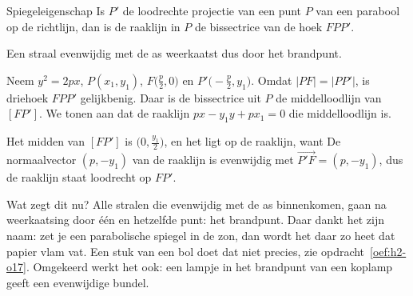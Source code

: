 \begin{theorie}
\begin{minipage}[t]{.6\linewidth}
\vspace{0pt}
\begin{stelling}{Spiegeleigenschap}
Is $P'$ de loodrechte projectie van een punt $P$ van een parabool op de richtlijn, dan is de raaklijn in $P$ de bissectrice van de hoek $FPP'$.

\vspace{1mm}
Een straal evenwijdig met de as weerkaatst dus door het brandpunt.
\end{stelling}

\begin{bewijs}
Neem $y^2 = 2px$, $P(x_1, y_1)$, $F\bigl(\tfrac p2, 0\bigr)$ en $P'\bigl(-\tfrac p2, y_1\bigr)$. Omdat $|PF| = |PP'|$, is driehoek $FPP'$ gelijkbenig. Daar is de bissectrice uit $P$ de middelloodlijn van $[FP']$. We tonen aan dat de raaklijn $px - y_1 y + px_1 = 0$ die middelloodlijn is.

Het midden van $[FP']$ is $\bigl(0, \tfrac{y_1}{2}\bigr)$, en het ligt op de raaklijn, want
De normaalvector $(p, -y_1)$ van de raaklijn is evenwijdig met $\overrightarrow{P'F} = (p, -y_1)$, dus de raaklijn staat loodrecht op $FP'$.
\end{bewijs}
\end{minipage}\hfill
\begin{minipage}[t]{.36\linewidth}
\vspace{0pt}
\centering
{}
\end{minipage}
\end{theorie}

Wat zegt dit nu? Alle stralen die evenwijdig met de as binnenkomen, gaan na weerkaatsing door één en hetzelfde punt: het brandpunt. Daar dankt het zijn naam: zet je een parabolische spiegel in de zon, dan wordt het daar zo heet dat papier vlam vat. Een stuk van een bol doet dat niet precies, zie opdracht~\ref{oef:h2-o17}. Omgekeerd werkt het ook: een lampje in het brandpunt van een koplamp geeft een evenwijdige bundel.


